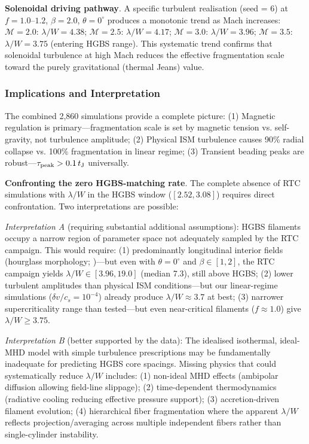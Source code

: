\documentclass[twocolumn]{mnras}
\begin{document}
\textbf{Solenoidal driving pathway}. A specific turbulent realisation (seed = 6) at $f = 1.0$--$1.2$, $\beta = 2.0$, $\theta = 0^{\circ}$ produces a monotonic trend as Mach increases: $\mathcal{M} = 2.0$: $\lambda/W = 4.38$; $\mathcal{M} = 2.5$: $\lambda/W = 4.17$; $\mathcal{M} = 3.0$: $\lambda/W = 3.96$; $\mathcal{M} = 3.5$: $\lambda/W = 3.75$ (entering HGBS range). This systematic trend confirms that solenoidal turbulence at high Mach reduces the effective fragmentation scale toward the purely gravitational (thermal Jeans) value.

\subsubsection{Implications and Interpretation}

The combined 2,860 simulations provide a complete picture: (1) Magnetic regulation is primary—fragmentation scale is set by magnetic tension vs. self-gravity, not turbulence amplitude; (2) Physical ISM turbulence causes 90\% radial collapse vs. 100\% fragmentation in linear regime; (3) Transient beading peaks are robust—$\tau_{\rm peak} > 0.1\,t_{\rm J}$ universally.

\textbf{Confronting the zero HGBS-matching rate}. The complete absence of RTC simulations with $\lambda/W$ in the HGBS window ($[2.52, 3.08]$) requires direct confrontation. Two interpretations are possible:

\textit{Interpretation A} (requiring substantial additional assumptions): HGBS filaments occupy a narrow region of parameter space not adequately sampled by the RTC campaign. This would require: (1) predominantly longitudinal interior fields (hourglass morphology; \citet{Jadhav2026})—but even with $\theta = 0^{\circ}$ and $\beta \in [1, 2]$, the RTC campaign yields $\lambda/W \in [3.96, 19.0]$ (median 7.3), still above HGBS; (2) lower turbulent amplitudes than physical ISM conditions—but our linear-regime simulations ($\delta v/c_s = 10^{-4}$) already produce $\lambda/W \approx 3.7$ at best; (3) narrower supercriticality range than tested—but even near-critical filaments ($f \approx 1.0$) give $\lambda/W \geq 3.75$.

\textit{Interpretation B} (better supported by the data): The idealised isothermal, ideal-MHD model with simple turbulence prescriptions may be fundamentally inadequate for predicting HGBS core spacings. Missing physics that could systematically reduce $\lambda/W$ includes: (1) non-ideal MHD effects (ambipolar diffusion allowing field-line slippage); (2) time-dependent thermodynamics (radiative cooling reducing effective pressure support); (3) accretion-driven filament evolution; (4) hierarchical fiber fragmentation where the apparent $\lambda/W$ reflects projection/averaging across multiple independent fibers rather than single-cylinder instability.
\end{document}
